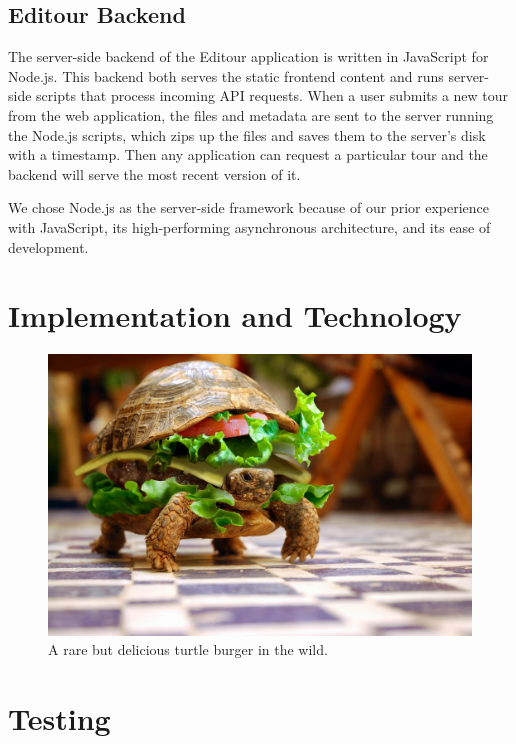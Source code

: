 \documentclass[a4paper, 10pt, american, titlepage]{article}
\begin{document}
\subsection{Editour Backend}
\label{sec:editourBackend}

The server-side backend of the Editour application is written in JavaScript for
Node.js. This backend both serves the static frontend content and runs
server-side scripts that process incoming API requests. When a user submits a
new tour from the web application, the files and metadata are sent to the server
running the Node.js scripts, which zips up the files and saves them to the
server's disk with a timestamp. Then any application can request a particular
tour and the backend will serve the most recent version of it.

We chose Node.js as the server-side framework because of our prior experience
with JavaScript, its high-performing asynchronous architecture, and its ease of
development.

\section{Implementation and Technology}
\label{sec:implementationAndTechnology}

\begin{figure}[h]
	\centering
	\includegraphics[width=\textwidth]{turtle-burger.jpg}
	\caption{A rare but delicious turtle burger in the wild.}
	\label{fig:turtleBurger}
\end{figure}

\section{Testing}
\label{sec:testing}
\end{document}
